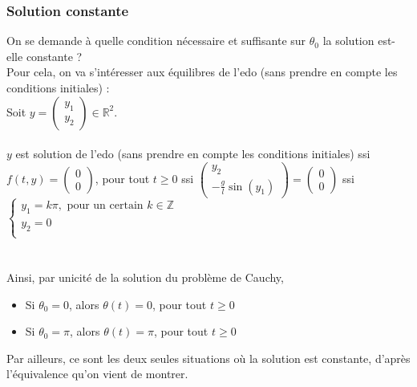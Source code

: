 \documentclass[9pt,a4paper]{article}
\begin{document}
\subsubsection{Solution constante}
On se demande à quelle condition nécessaire et suffisante sur $\theta_0$ la solution est-elle constante ?\\
Pour cela, on va s'intéresser aux équilibres de l'\gls{edo} (sans prendre en compte les conditions initiales) :\\
Soit $y = \begin{pmatrix}
    y_1 \\
    y_2
\end{pmatrix} \in \mathbb{R}^2$.\\\\
$y$ est solution de l'\gls{edo} (sans prendre en compte les conditions initiales) ssi $f(t, y) = \begin{pmatrix}
    0 \\
    0
\end{pmatrix}$, pour tout $t \geq 0$ ssi $\begin{pmatrix}
    y_2 \\
    -\frac{g}{l}\sin(y_1)
\end{pmatrix} = \begin{pmatrix}
    0 \\
    0
\end{pmatrix}$ ssi $\left\{
  \begin{array}{lcl}
    y_1 = k\pi, \text{ pour un certain $k \in \mathbb{Z}$} \\
    y_2 = 0 \\
  \end{array}
\right.$\\\\\\
Ainsi, par unicité de la solution du problème de Cauchy,
\begin{itemize}[label=\textbullet]
    \item Si $\theta_0 = 0$, alors $\theta(t) = 0$, pour tout $t \geq 0$
    \item Si $\theta_0 = \pi$, alors $\theta(t) = \pi$, pour tout $t \geq 0$
\end{itemize}
Par ailleurs, ce sont les deux seules situations où la solution est constante, d'après l'équivalence qu'on vient de montrer.
\end{document}

